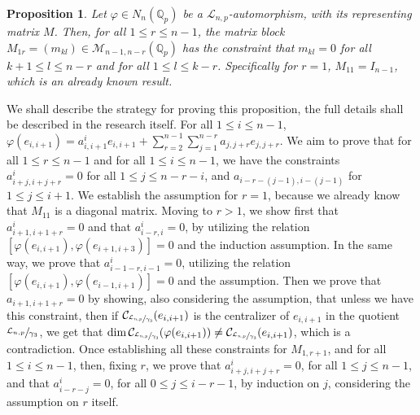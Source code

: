 \documentclass[12pt]{article}
\newtheorem{proposition}[theorem]{Proposition}
\begin{document}
\begin{proposition}
Let $\varphi\in{N_n(\mathbb{Q}_p)}$ be a $\mathcal{L}_{n,p}$-automorphism, with its representing matrix $M$. Then, for all $1\leq{r}\leq{n-1}$, the matrix block $M_{1r}=(m_{kl})\in\mathcal{M}_{n-1,n-r}(\mathbb{Q}_p)$ has the constraint that $m_{kl}=0$ for all ${k+1}\leq{l}\leq{n-r}$ and for all $1\leq{l}\leq{k-r}$. Specifically for $r=1$, $M_{11}=I_{n-1}$, which is an already known result.
\end{proposition}
We shall describe the strategy for proving this proposition, the full details shall be described in the research itself. For all $1\leq{i}\leq{n-1}$, $\varphi(e_{i,i+1})=a_{i,i+1}^{i}e_{i,i+1}+\sum_{r=2}^{n-1}\sum_{j=1}^{n-r}a_{j,j+r}e_{j,j+r}$. We aim to prove that for all $1\leq{r}\leq{n-1}$ and for all $1\leq{i}\leq{n-1}$, we have the constraints $a_{i+j,i+j+r}^{i}=0$ for all $1\leq{j}\leq{n-r-i}$, and $a_{i-r-(j-1),i-(j-1)}$ for $1\leq{j}\leq {i+1}$. We establish the assumption for $r=1$, because we already know that $M_{11}$ is a diagonal matrix. Moving to $r>1$, we show first that $a_{i+1,i+1+r}^{i}=0$ and that $a_{i-r,i}^{i}=0$, by utilizing the relation $[\varphi(e_{i,i+1}),\varphi(e_{i+1,i+3})]=0$ and the induction assumption.
In the same way, we prove that $a_{i-1-r,i-1}^{i}=0$, utilizing the relation $[\varphi(e_{i,i+1}),\varphi(e_{i-1,i+1})]=0$ and the assumption.
Then we prove that $a_{i+1,i+1+r}=0$ by showing, also considering the assumption, that unless we have this constraint, then if $\mathcal{C}_{\sfrac{\mathcal{L}_{n,p}}{\gamma_3}}(e_{i,i+1})$ is the centralizer of $e_{i,i+1}$ in the quotient $\sfrac{\mathcal{L}_{n,p}}{\gamma_3}$, we get that $\dim\mathcal{C}_{\sfrac{\mathcal{L}_{n,p}}{\gamma_3}}(\varphi(e_{i,i+1}))\neq\mathcal{C}_{\sfrac{\mathcal{L}_{n,p}}{\gamma_3}}(e_{i,i+1})$, which is a contradiction. Once establishing all these constraints for $M_{1,r+1}$, and for all $1\leq{i}\leq{n-1}$, then, fixing $r$, we prove that $a_{i+j,i+j+r}^{i}=0$, for all $1\leq{j}\leq{n-1}$, and that $a_{i-r-j}^{i}=0$, for all $0\leq{j}\leq{i-r-1}$, by induction on $j$, considering the assumption on $r$ itself.
\end{document}

